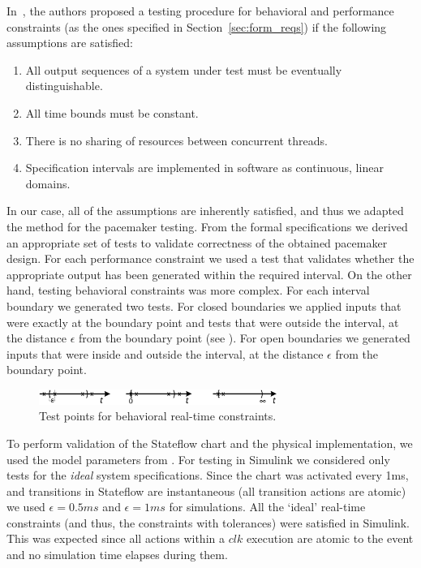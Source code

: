 In~\cite{ClarkeLee}, the authors proposed a testing procedure for behavioral and performance constraints (as the ones specified in Section~\ref{sec:form_reqs}) if the following assumptions are satisfied:

\begin{enumerate}
\item All output sequences of a system under test must be eventually distinguishable.
\item All time bounds must be constant.
\item There is no sharing of resources between concurrent threads.
\item Specification intervals are implemented in software as continuous, linear domains.
\end{enumerate}

In our case, all of the assumptions are inherently satisfied,  and thus we adapted the method for the pacemaker testing. From the formal specifications we derived an appropriate set of tests to validate correctness of the obtained pacemaker design. For each performance constraint we used a test that validates whether the appropriate output has been generated within the required interval. On the other hand, testing behavioral constraints was more complex. For each interval boundary we generated two tests. For closed boundaries we applied inputs that were exactly at the boundary point and tests that were outside the interval, at the distance $\epsilon$ from the boundary point (see ). For open boundaries we generated inputs that were inside and outside the interval, at the distance $\epsilon$ from the boundary point.


\begin{figure} [!t]
\center
		\includegraphics[width=0.69\textwidth]{figs/test_vects.png}
\caption{Test points for behavioral real-time constraints.}
\label{fig:b_tests}
\end{figure}


To perform validation of the Stateflow chart and the physical implementation, we used the model parameters from . For testing in Simulink we considered only tests for the \textit{ideal} system specifications. Since the chart was activated every 1ms, and transitions in Stateflow are instantaneous (all transition actions are atomic) we used $\epsilon = 0.5 ms$ and $\epsilon = 1 ms$ for simulations. All the `ideal' real-time constraints (and thus, the constraints with tolerances) were satisfied in Simulink. This was expected since all actions within a $clk$ execution are atomic to the event and no simulation time elapses during them. 

